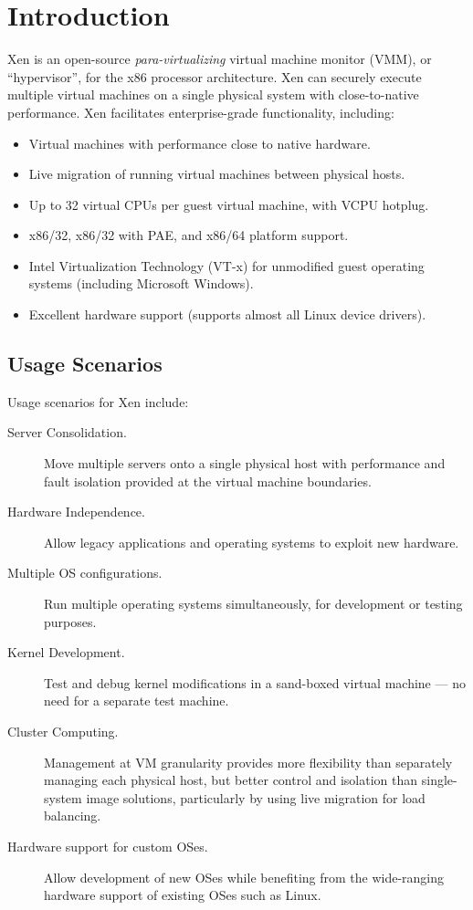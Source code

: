 \documentclass[11pt,twoside,final,openright]{report}
\begin{document}
\chapter{Introduction}


Xen is an open-source \emph{para-virtualizing} virtual machine monitor
(VMM), or ``hypervisor'', for the x86 processor architecture. Xen can
securely execute multiple virtual machines on a single physical system
with close-to-native performance.  Xen facilitates enterprise-grade
functionality, including:

\begin{itemize}
\item Virtual machines with performance close to native hardware.
\item Live migration of running virtual machines between physical hosts.
\item Up to 32 virtual CPUs per guest virtual machine, with VCPU hotplug.
\item x86/32, x86/32 with PAE, and x86/64 platform support.
\item Intel Virtualization Technology (VT-x) for unmodified guest operating systems (including Microsoft Windows).
\item Excellent hardware support (supports almost all Linux device
  drivers). 
\end{itemize}


\section{Usage Scenarios}

Usage scenarios for Xen include:

\begin{description}
\item [Server Consolidation.] Move multiple servers onto a single
  physical host with performance and fault isolation provided at the
  virtual machine boundaries.
\item [Hardware Independence.] Allow legacy applications and operating 
  systems to exploit new hardware.
\item [Multiple OS configurations.] Run multiple operating systems
  simultaneously, for development or testing purposes.
\item [Kernel Development.] Test and debug kernel modifications in a
  sand-boxed virtual machine --- no need for a separate test machine.
\item [Cluster Computing.] Management at VM granularity provides more
  flexibility than separately managing each physical host, but better
  control and isolation than single-system image solutions,
  particularly by using live migration for load balancing.
\item [Hardware support for custom OSes.] Allow development of new
  OSes while benefiting from the wide-ranging hardware support of
  existing OSes such as Linux.
\end{description}
\end{document}
